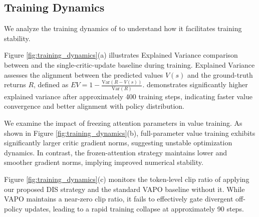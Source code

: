 \subsection{Training Dynamics}
We analyze the training dynamics of \model to understand how it facilitates training stability.

 Figure \ref{fig:training_dynamics}(a) illustrates Explained Variance comparison between \model and the single-critic-update baseline during training. Explained Variance assesses the alignment between the predicted values $V(s)$ and the ground-truth returns $R$, defined as $EV = 1 - \frac{\text{Var}(R - V(s))}{\text{Var}(R)}$. 
\model demonstrates significantly higher explained variance after approximately 400 training steps, indicating faster value convergence and better alignment with policy distribution.

 We examine the impact of freezing attention parameters in value training. As shown in Figure \ref{fig:training_dynamics}(b), full-parameter value training exhibits significantly larger critic gradient norms, suggesting unstable optimization dynamics. In contrast, the frozen-attention strategy maintains lower and smoother gradient norms, implying improved numerical stability.

 Figure \ref{fig:training_dynamics}(c) monitors the token-level clip ratio of \model applying our proposed DIS strategy and the standard VAPO baseline without it. While VAPO maintains a near-zero clip ratio, it fails to effectively gate divergent off-policy updates, leading to a rapid training collapse at approximately 90 steps. 

    
